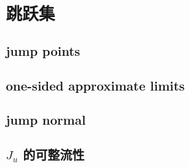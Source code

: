 \section{跳跃集}
\label{b1:sec:2802}


\subsection{jump points}
\label{b1:subsec:280201}

\subsection{one-sided approximate limits}
\label{b1:subsec:280202}

\subsection{jump normal}
\label{b1:subsec:280203}

\subsection{\texorpdfstring{\(J_u\)}{Ju} 的可整流性}
\label{b1:subsec:280204}


